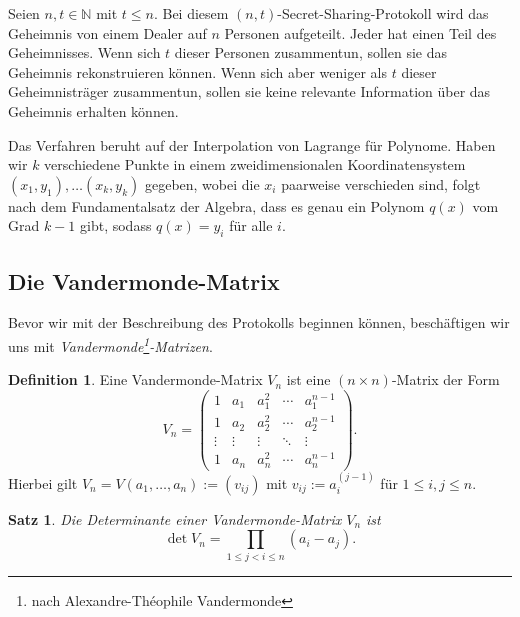 \documentclass[12pt, a4paper, oneside, titlepage]{report}
\newcommand{\N}{\mathds{N}}
\newtheorem{satz}[lemma]{Satz}
\theoremstyle{definition}
\newtheorem{def1}[lemma]{Definition}
\begin{document}
	Seien $ n, t \in \N $ mit $ t \leq n $. Bei diesem $ (n,t) $-Secret-Sharing-Protokoll wird das Geheimnis von einem Dealer auf $ n $ Personen aufgeteilt. Jeder hat einen Teil des Geheimnisses. Wenn sich $ t $ dieser Personen zusammentun, sollen sie das Geheimnis rekonstruieren können. Wenn sich aber weniger als $ t $ dieser Geheimnisträger zusammentun, sollen sie keine relevante Information über das Geheimnis erhalten können. \cite{buchmann}
	
	Das Verfahren beruht auf der Interpolation von Lagrange für Polynome. Haben wir $ k $ verschiedene Punkte in einem zweidimensionalen Koordinatensystem $ (x_1, y_1), \dots (x_k, y_k) $ gegeben, wobei die $ x_i $ paarweise verschieden sind, folgt nach dem Fundamentalsatz der Algebra, dass es genau ein Polynom $ q(x) $ vom Grad $ k - 1 $ gibt, sodass $ q(x) =y_i $ für alle $ i $. \cite{shamir}
	
	\subsection{Die Vandermonde-Matrix}
	
	Bevor wir mit der Beschreibung des Protokolls beginnen können, beschäftigen wir uns mit \emph{Vandermonde\footnote{nach Alexandre-Théophile Vandermonde}-Matrizen}.
	
	\begin{def1}
		Eine Vandermonde-Matrix $ V_n $ ist eine $ (n \times n) $-Matrix der Form
	$$V_n =
	\begin{pmatrix}
	1 & a_1 & a_1^2 & \cdots & a_1^{n-1} \\
	1 & a_2 & a_2^2 & \cdots & a_2^{n-1} \\
	\vdots & \vdots & \vdots & \ddots & \vdots \\     
	1 & a_n & a_n^2 & \cdots & a_n^{n-1}
	\end{pmatrix}.$$
	Hierbei gilt $V_n = V(a_1, \dots, a_n) := (v_{ij}) $ mit $ v_{ij} := a_i^{(j-1)} $ für $ 1 \leq i, j \leq n$.
	\end{def1}
	\begin{satz}
		Die Determinante einer Vandermonde-Matrix $ V_n $ ist
		$$ \det V_n = \prod_{1 \leq j < i \leq n} (a_i - a_j). $$
	\end{satz}
\end{document}
